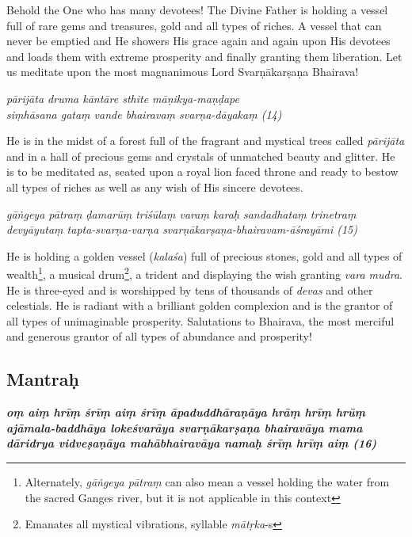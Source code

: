 \documentclass[11pt,oneside,a4paper]{article}
\newenvironment{shloka}[1]
  {\bigskip\center#1\varwidth{\linewidth}}
  {\endvarwidth\endcenter\bigskip}
\newcommand{\tl}[1]{\emph{#1}}
\begin{document}
Behold the One who has many devotees! The Divine Father is holding a vessel full
of rare gems and treasures, gold and all types of riches. A vessel that can
never be emptied and He showers His grace again and again upon His devotees and
loads them with extreme prosperity and finally granting them liberation. Let us
meditate upon the most magnanimous Lord Svarṇākarṣaṇa Bhairava!

\begin{shloka}\itshape
  pārijāta druma kāntāre sthite māṇikya-maṇḍape\\
  siṃhāsana gataṃ vande bhairavaṃ svarṇa-dāyakaṃ (14)
\end{shloka}

He is in the midst of a forest full of the fragrant and mystical trees called
\tl{pārijāta} and in a hall of precious gems and crystals of unmatched beauty
and glitter. He is to be meditated as, seated upon a royal lion faced throne
and ready to bestow all types of riches as well as any wish of His sincere
devotees.

\begin{shloka}\itshape
  gāṅgeya pātraṃ ḍamarūṃ triśūlaṃ varaṃ karaḥ sandadhataṃ trinetraṃ\\
  devyāyutaṃ tapta-svarṇa-varṇa svarṇākarṣaṇa-bhairavam-āśrayāmi (15)
\end{shloka}

He is holding a golden vessel (\tl{kalaśa}) full of precious stones, gold and
all types of wealth\footnote{Alternately, \tl{gāṅgeya pātraṃ} can also mean
a vessel holding the water from the sacred Ganges river, but it is not
applicable in this context}, a musical drum\footnote{Emanates all mystical
vibrations, syllable \tl{mātṛka}-s}, a trident and displaying the wish granting
\tl{vara mudra}. He is three-eyed and is worshipped by tens of thousands of
\tl{devas} and other celestials. He is radiant with a brilliant golden
complexion and is the grantor of all types of unimaginable prosperity.
Salutations to Bhairava, the most merciful and generous grantor of all types
of abundance and prosperity!

\subsection{Mantraḥ}

\begin{shloka}\itshape\bfseries
  oṃ aiṃ hrīṃ śrīṃ aiṃ śrīṃ āpaduddhāraṇāya hrāṃ hrīṃ hrūṃ ajāmala-baddhāya
  lokeśvarāya svarṇākarṣaṇa bhairavāya mama dāridrya vidveṣaṇāya mahābhairavāya
  namaḥ śrīṃ hrīṃ aiṃ (16)
\end{shloka}
\end{document}
